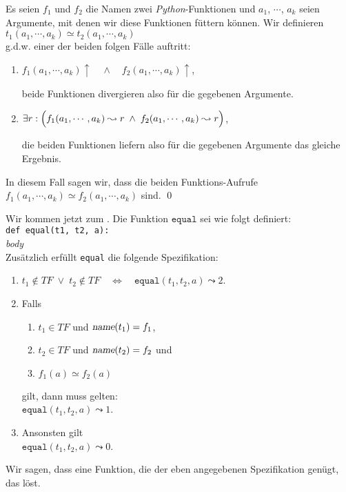 \begin{Definition}  
Es seien $f_1$ und $f_2$ die Namen zwei \textsl{Python}-Funktionen und
  $a_1$, $\cdots$, $a_k$ seien Argumente, mit denen wir diese Funktionen füttern können. Wir definieren \\[0.1cm]
\hspace*{1.3cm} $t_1(a_1,\cdots,a_k) \simeq t_2(a_1,\cdots,a_k)$ \\[0.1cm]
g.d.w. einer der beiden folgen Fälle auftritt:
\begin{enumerate}
\item $f_1(a_1,\cdots,a_k)\uparrow \quad\wedge\quad f_2(a_1,\cdots,a_k)\uparrow$,

      beide Funktionen divergieren also für die gegebenen Argumente.
\item $\exists r: \Bigl(f_1(a_1,\cdots,a_k) \leadsto r \;\wedge\; f_2(a_1,\cdots,a_k) \leadsto r\Bigr)$,

      die beiden Funktionen liefern also für die gegebenen Argumente das gleiche Ergebnis.
\end{enumerate}
      In diesem Fall sagen wir, dass die beiden Funktions-Aufrufe 
      $f_1(a_1,\cdots,a_k) \simeq f_2(a_1,\cdots,a_k)$  sind.  
      \qed
\end{Definition}

\noindent
Wir kommen jetzt zum .  Die Funktion $\texttt{equal}$ sei wie folgt definiert:
\\[0.2cm]
\hspace*{1.3cm} \texttt{def equal(t1, t2, a):} \\
\hspace*{2.2cm} \textsl{body}
\\[0.2cm]
Zusätzlich erfüllt \texttt{equal} die folgende Spezifikation:
\begin{enumerate}
\item $t_1 \not\in T\!F \;\vee\; t_2 \not\in T\!F \quad\Leftrightarrow\quad \texttt{equal}(t_1, t_2, a) \leadsto 2$.
\item Falls 
  \begin{enumerate}
  \item $t_1 \in T\!F$ \quad und \quad $\textsl{name}(t_1) = f_1$,
  \item $t_2 \in T\!F$ \quad und \quad $\textsl{name}(t_2) = f_2$ \quad und
  \item $f_1(a) \simeq f_2(a)$
  \end{enumerate}
    gilt, dann muss gelten: \\[0.1cm]
   \hspace*{1.3cm}  $\texttt{equal}(t_1, t_2, a) \leadsto 1$.
\item Ansonsten gilt \\[0.1cm]
      \hspace*{1.3cm} $\texttt{equal}(t_1, t_2, a) \leadsto 0$.
\end{enumerate}
Wir sagen, dass eine Funktion, die der eben angegebenen Spezifikation genügt, das
 löst.

